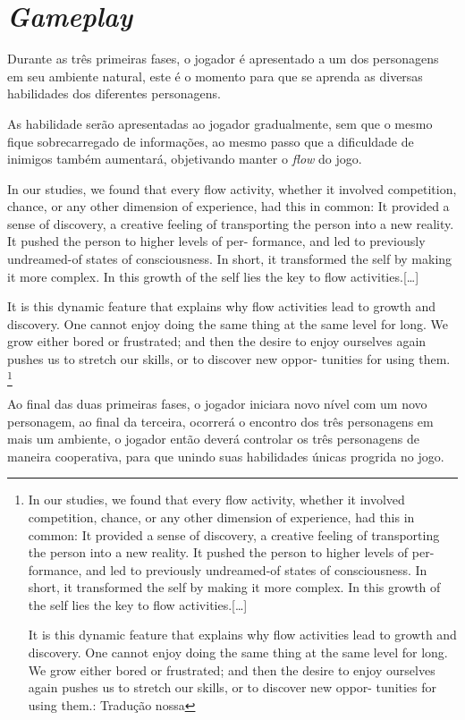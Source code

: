 \section{\textit{Gameplay}}

Durante as três primeiras fases, o jogador é apresentado a um dos personagens em seu ambiente natural, este é o momento para que se aprenda as diversas habilidades dos diferentes personagens.

As habilidade serão apresentadas ao jogador gradualmente, sem que o mesmo fique sobrecarregado de informações, ao mesmo passo que a dificuldade de inimigos também aumentará, objetivando manter o \textit{flow} do jogo.
\begin{citacao}
In our studies, we found that every flow activity, whether it involved competition, chance, or any other dimension of experience, had this in common: It provided a sense of discovery, a creative feeling of transporting the person into a new reality. It pushed the person to higher levels of per- formance, and led to previously undreamed-of states of consciousness. In short, it transformed the self by making it more complex. In this growth of the self lies the key to flow activities.[\ldots]

It is this dynamic feature that explains why flow activities lead to growth and discovery. One cannot enjoy doing the same thing at the same level for long. We grow either bored or frustrated; and then the desire to enjoy ourselves again pushes us to stretch our skills, or to discover new oppor- tunities for using them.
\cite[74,75]{mihalyi2009}\footnote{In our studies, we found that every flow activity, whether it involved competition, chance, or any other dimension of experience, had this in common: It provided a sense of discovery, a creative feeling of transporting the person into a new reality. It pushed the person to higher levels of per- formance, and led to previously undreamed-of states of consciousness. In short, it transformed the self by making it more complex. In this growth of the self lies the key to flow activities.[\ldots]

It is this dynamic feature that explains why flow activities lead to growth and discovery. One cannot enjoy doing the same thing at the same level for long. We grow either bored or frustrated; and then the desire to enjoy ourselves again pushes us to stretch our skills, or to discover new oppor- tunities for using them.: Tradução nossa}
\end{citacao}

Ao final das duas primeiras fases, o jogador iniciara novo nível com um novo personagem, ao final da terceira, ocorrerá o encontro dos três personagens em mais um ambiente, o jogador então deverá controlar os três personagens de maneira cooperativa, para que unindo suas habilidades únicas progrida no jogo.


